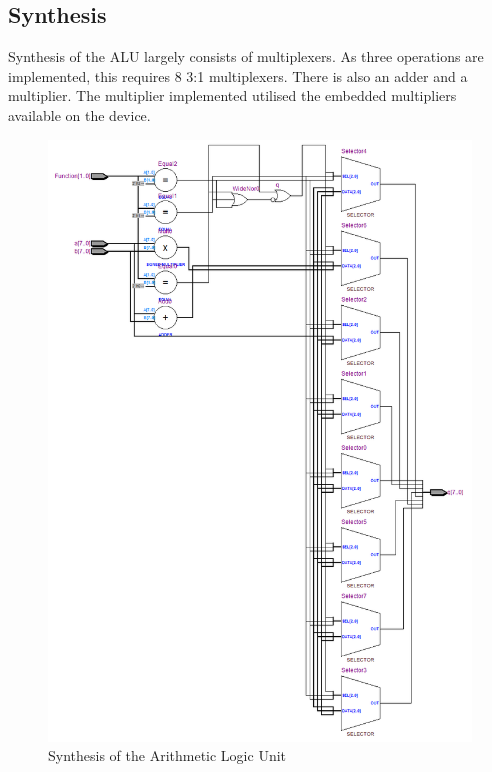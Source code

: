 \subsection{Synthesis}

Synthesis of the ALU largely consists of multiplexers. 
As three operations are implemented, this requires 8 3:1 multiplexers. 
There is also an adder and a multiplier. 
The multiplier implemented utilised the embedded multipliers available on the device.

\begin{figure}
\includegraphics[height=\textheight]{Figures/alusynth.png}
\caption{Synthesis of the Arithmetic Logic Unit}
\label{fig:alusynth}
\end{figure}

